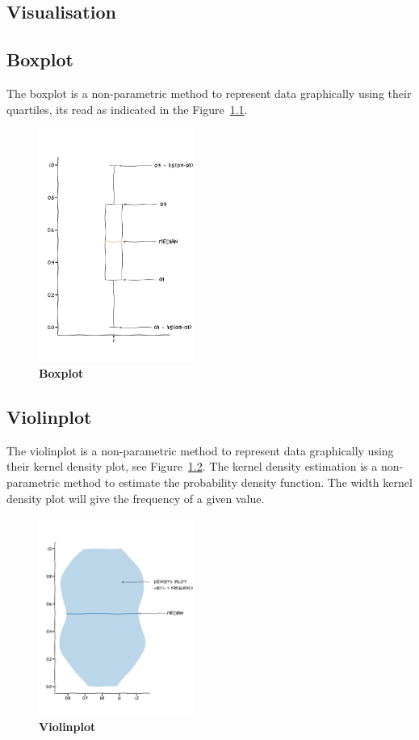 \begin{appendices}

  \chapter{Visualisation}
    \section{Boxplot}
    The boxplot is a non-parametric method to represent data graphically using their quartiles, its read as indicated in the Figure~\ref{boxplot}.
      \begin{figure}[h]
        \centering
        \includegraphics[width=0.45\textwidth]{part_2/assets/boxplot.png}
        \caption{\textbf{Boxplot}}
        \label{boxplot}
      \end{figure}

    \section{Violinplot}
    The violinplot is a non-parametric method to represent data graphically using their kernel density plot, see Figure~\ref{violinplot}. The kernel density estimation is a non-parametric method to estimate the probability density function. The width kernel density plot will give the frequency of a given value.
      \begin{figure}[h]
        \centering
        \includegraphics[width=0.45\textwidth]{part_2/assets/violinplot.png}
        \caption{\textbf{Violinplot}}
        \label{violinplot}
      \end{figure}


\end{appendices}

